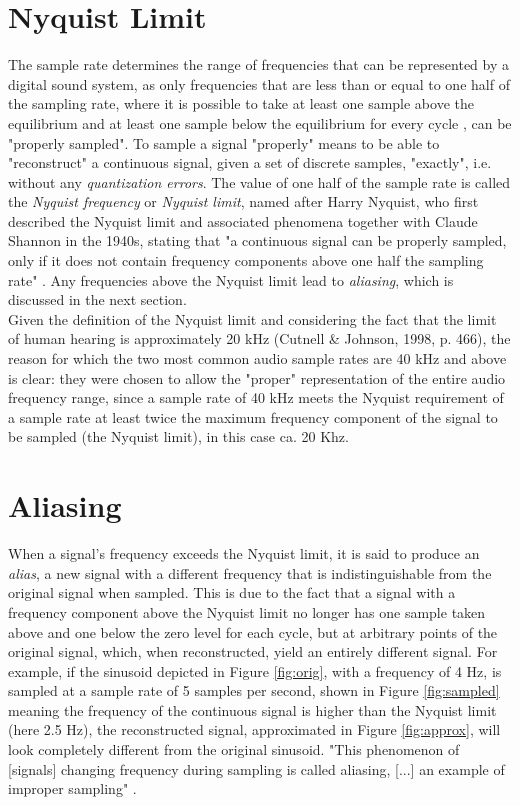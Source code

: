 \documentclass[12pt,twoside]{report}
\begin{document}
\section{Nyquist Limit}

The sample rate determines the range of frequencies that can be represented by a digital sound system, as only frequencies that are less than or equal to one half of the sampling rate, where it is possible to take at least one sample above the equilibrium and at least one sample below the equilibrium for every cycle , can be "properly sampled". To sample a signal "properly" means to be able to "reconstruct" a continuous signal, given a set of discrete samples, "exactly", i.e. without any \emph{quantization errors}. The value of one half of the sample rate is called the \emph{Nyquist frequency} or \emph{Nyquist limit}, named after Harry Nyquist, who first described the Nyquist limit and associated phenomena together with Claude Shannon in the 1940s, stating that "a continuous signal can be properly sampled, only if it does not contain frequency components above one half the sampling rate" . Any frequencies above the Nyquist limit lead to \emph{aliasing}, which is discussed in the next section.\\

\noindent Given the definition of the Nyquist limit and considering the fact that the limit of human hearing is approximately 20 kHz (Cutnell \& Johnson, 1998, p. 466), the reason for which the two most common audio sample rates are 40 kHz and above is clear: they were chosen to allow the "proper" representation of the entire audio frequency range, since a sample rate of 40 kHz meets the Nyquist requirement of a sample rate at least twice the maximum frequency component of the signal to be sampled (the Nyquist limit), in this case ca. 20 Khz.

\section{Aliasing}

When a signal's frequency exceeds the Nyquist limit, it is said to produce an \emph{alias}, a new signal with a different frequency that is indistinguishable from the original signal when sampled. This is due to the fact that a signal with a frequency component above the Nyquist limit no longer has one sample taken above and one below the zero level for each cycle, but at arbitrary points of the original signal, which, when reconstructed, yield an entirely different signal. For example, if the sinusoid depicted in Figure \ref{fig:orig}, with a frequency of 4 Hz, is sampled at a sample rate of 5 samples per second, shown in Figure \ref{fig:sampled} meaning the frequency of the continuous signal is higher than the Nyquist limit (here 2.5 Hz), the reconstructed signal, approximated in Figure \ref{fig:approx}, will look completely different from the original sinusoid. "This phenomenon of [signals] changing frequency during sampling is called aliasing, [...] an example of improper sampling" .
\end{document}
